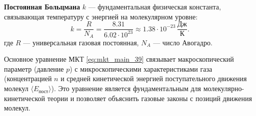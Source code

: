 \begin{definition}
\textbf{Постоянная Больцмана} $k$ --- фундаментальная физическая константа, связывающая температуру с энергией на молекулярном уровне:
\begin{equation}
    k = \frac{R}{N_A} = \frac{8.31}{6.02 \cdot 10^{23}} \approx 1.38 \cdot 10^{-23} \, \frac{\text{Дж}}{\text{К}}. \label{eq:boltzmann_39}
\end{equation}
где $R$ --- универсальная газовая постоянная, $N_A$ --- число Авогадро.
\end{definition}

\begin{remark}
Основное уравнение МКТ \eqref{eq:mkt_main_39} связывает макроскопический параметр (давление $p$) с микроскопическими характеристиками газа (концентрацией $n$ и средней кинетической энергией поступательного движения молекул $\langle E_{\text{пост}} \rangle$). Это уравнение является фундаментальным для молекулярно-кинетической теории и позволяет объяснить газовые законы с позиций движения молекул.
\end{remark}


